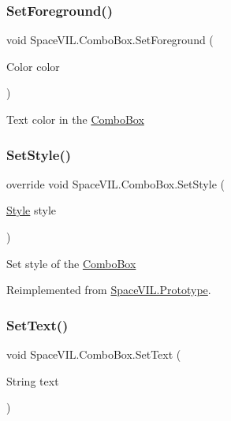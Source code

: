 \subsubsection{\texorpdfstring{Set\+Foreground()}{SetForeground()}}
{\footnotesize\ttfamily void Space\+V\+I\+L.\+Combo\+Box.\+Set\+Foreground (\begin{DoxyParamCaption}\item[{Color}]{color }\end{DoxyParamCaption})}



Text color in the \mbox{\hyperlink{class_space_v_i_l_1_1_combo_box}{Combo\+Box}} 

\mbox{\label{class_space_v_i_l_1_1_combo_box_a5aaf1e459ca198f19c8bc4805f5f3b10}} 
\subsubsection{\texorpdfstring{Set\+Style()}{SetStyle()}}
{\footnotesize\ttfamily override void Space\+V\+I\+L.\+Combo\+Box.\+Set\+Style (\begin{DoxyParamCaption}\item[{\mbox{\hyperlink{class_space_v_i_l_1_1_decorations_1_1_style}{Style}}}]{style }\end{DoxyParamCaption})\hspace{0.3cm}{\ttfamily [virtual]}}



Set style of the \mbox{\hyperlink{class_space_v_i_l_1_1_combo_box}{Combo\+Box}} 



Reimplemented from \mbox{\hyperlink{class_space_v_i_l_1_1_prototype_ae96644a6ace490afb376fb542161e541}{Space\+V\+I\+L.\+Prototype}}.

\mbox{\label{class_space_v_i_l_1_1_combo_box_a9a72026c1c366df889b2f8829e965b98}} 
\subsubsection{\texorpdfstring{Set\+Text()}{SetText()}}
{\footnotesize\ttfamily void Space\+V\+I\+L.\+Combo\+Box.\+Set\+Text (\begin{DoxyParamCaption}\item[{String}]{text }\end{DoxyParamCaption})}



